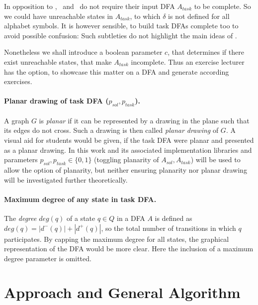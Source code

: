In opposition to \CompDist, \CompUnr\ and \RemUnr\ do not require their input DFA $A_{task}$ to be complete. So we could have unreachable states in $A_{task}$, to which $\delta$ is not defined for all alphabet symbols. It is however sensible, to build task DFAs complete too to avoid possible confusion: Such subtleties do not highlight the main ideas of \MinAlg.

Nonetheless we shall introduce a boolean parameter $c$, that determines if there exist unreachable states, that make $A_{task}$ incomplete. Thus an exercise lecturer has the option, to showcase this matter on a DFA and generate according exercises.

\paragraph*{Planar drawing of task DFA \texorpdfstring{($p_{sol}, p_{task}$)}{}.}

A graph $G$ is \emph{planar} if it can be represented by a drawing in the plane such that its edges do not cross. Such a drawing is then called \emph{planar drawing} of $G$. A visual aid for students would be given, if the task DFA were planar and presented as a planar drawing. In this work and its associated implementation libraries and parameters $p_{sol}, p_{task} \in \{0,1\}$ (toggling planarity of $A_{sol}, A_{task}$) will be used to allow the option of planarity, but neither ensuring planarity nor planar drawing will be investigated further theoretically.

\paragraph*{Maximum degree of any state in task DFA.}

The \emph{degree} $deg(q)$ of a state $q \in Q$ in a DFA $A$ is defined as $deg(q) = |d^-(q)| + |d^+(q)|$, so the total number of transitions in which $q$ participates. By capping the maximum degree for all states, the graphical representation of the DFA would be more clear. Here the inclusion of a maximum degree parameter is omitted.


\section{Approach and General Algorithm}

